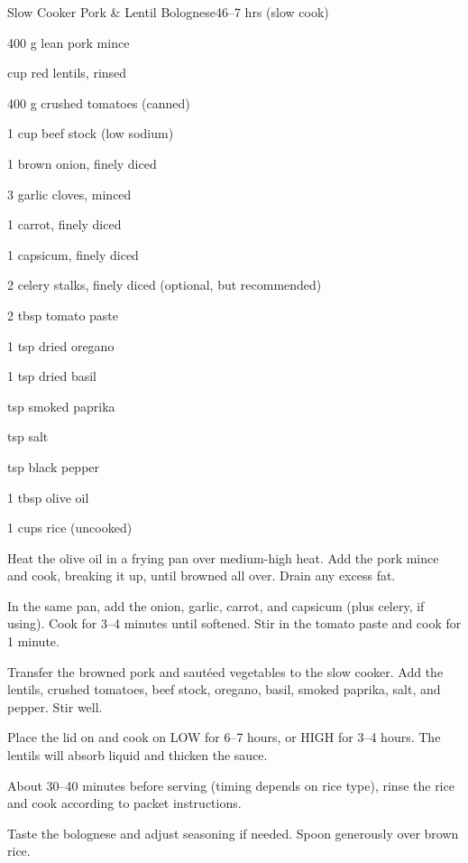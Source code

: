 \begin{recipebox}{Slow Cooker Pork \& Lentil Bolognese}{4}{6--7 hrs (slow cook)}

\begin{ingredients}
  \item 400 g lean pork mince
  \item {} cup red lentils, rinsed
  \item 400 g crushed tomatoes (canned)
  \item 1 cup beef stock (low sodium)
  \item 1 brown onion, finely diced
  \item 3 garlic cloves, minced
  \item 1 carrot, finely diced
  \item 1 capsicum, finely diced
  \item 2 celery stalks, finely diced (optional, but recommended)
  \item 2 tbsp tomato paste
  \item 1 tsp dried oregano
  \item 1 tsp dried basil
  \item {} tsp smoked paprika
  \item {} tsp salt
  \item {} tsp black pepper
  \item 1 tbsp olive oil
  \item 1 cups rice (uncooked)
\end{ingredients}

\begin{method}
  \item Heat the olive oil in a frying pan over medium-high heat. Add the pork mince and cook, breaking it up, until browned all over. Drain any excess fat.
  \item In the same pan, add the onion, garlic, carrot, and capsicum (plus celery, if using). Cook for 3--4 minutes until softened. Stir in the tomato paste and cook for 1 minute.
  \item Transfer the browned pork and saut\'eed vegetables to the slow cooker. Add the lentils, crushed tomatoes, beef stock, oregano, basil, smoked paprika, salt, and pepper. Stir well.
  \item Place the lid on and cook on LOW for 6--7 hours, or HIGH for 3--4 hours. The lentils will absorb liquid and thicken the sauce.
  \item About 30--40 minutes before serving (timing depends on rice type), rinse the rice and cook according to packet instructions.
  \item Taste the bolognese and adjust seasoning if needed. Spoon generously over brown rice.
\end{method}


\end{recipebox}
